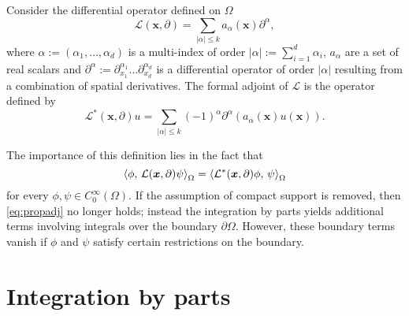 \begin{definition}\label{def:foradj}
	Consider the differential operator defined on $\Omega$
	\begin{equation}
	\mathcal{L}(\bm{x}, \partial) =\sum_{|\alpha| \le k} a_\alpha(\bm{x})\partial^\alpha,
	\end{equation}
	where $\alpha := (\alpha_1, \dots , \alpha_d)$ is a multi-index of order $|\alpha| := \sum_{i=1}^d \alpha_i$, $a_\alpha$ are a set of  real scalars and $\partial^{\alpha} := \partial_{x_1}^{\alpha_1} \dots \partial_{x_d}^{\alpha_d}$ is a differential operator of order $|\alpha|$ resulting from a combination of spatial derivatives. The formal adjoint of $\mathcal{L}$ is the operator defined by
	\begin{equation}
	\mathcal{L}^*(\bm{x}, \partial)u = \sum_{|\alpha| \le k} (-1)^\alpha \partial^\alpha(a_\alpha(\bm{x}) u(\bm{x})).
	\end{equation}
\end{definition}
The importance of this definition lies in the fact that
\begin{equation}\label{eq:propadj}
\inner[\Omega]{\phi}{ \mathcal{L}(\bm{x}, \partial)\psi} = \inner[\Omega]{\mathcal{L}^*(\bm{x}, \partial)\phi}{\psi}
\end{equation}
for every $\phi, \psi \in C^\infty_0(\Omega)$. If the assumption of compact support is removed, then \eqref{eq:propadj} no longer holds; instead the integration by parts yields additional terms involving integrals over the boundary $\partial\Omega$. However, these boundary terms vanish if $\phi$ and $\psi$ satisfy certain restrictions on the boundary. 


\section{Integration by parts}

